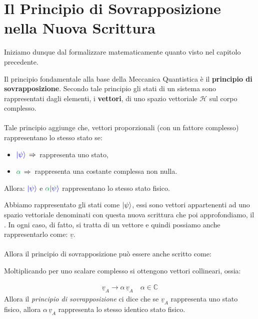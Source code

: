 \section{Il Principio di Sovrapposizione nella Nuova Scrittura}

	Iniziamo dunque dal formalizzare matematicamente quanto visto nel capitolo precedente. 
	
\begin{myth}
	Il principio fondamentale alla base della Meccanica Quantistica è il \textbf{principio di sovrapposizione}. Secondo tale principio gli stati di un sistema sono rappresentati dagli elementi, i \textbf{vettori}, di uno spazio vettoriale $\mathcal{H}$ sul corpo complesso. 
	\\
	\\
	Tale principio aggiunge che, vettori proporzionali (con un fattore complesso) rappresentano lo stesso stato se: 
	
\begin{itemize}
	\item $\textcolor{blue}{\ket{\psi}} \, \Rightarrow \, $ rappresenta uno stato,
	\item $\textcolor{ForestGreen}{\alpha} \, \Rightarrow \, $ rappresenta una costante complessa non nulla.
\end{itemize} 
	
	Allora: $\textcolor{blue}{\ket{\psi}}$ e $\textcolor{ForestGreen}{\alpha}\textcolor{blue}{\ket{\psi}}$ rappresentano lo stesso stato fisico.
\end{myth}

	Abbiamo rappresentato gli stati come $\ket{\psi}$, essi sono vettori appartenenti ad uno spazio vettoriale denominati con questa nuova scrittura che poi approfondiamo, il . In ogni caso, di fatto, si tratta di un vettore e quindi possiamo anche rappresentarlo come: $\underline{v}$. 
	\\
	\\
	Allora il principio di sovrapposizione può essere anche scritto come:

\begin{nb}
	Moltiplicando per uno scalare complesso si ottengono vettori collineari, ossia:
	
\begin{align*}
	\underline{v}_A \to \alpha \, \underline{v}_A \quad \alpha \in \mathbb{C}
\end{align*}
	Allora il \textit{principio di sovrapposizione} ci dice che se $\underline{v}_A$ rappresenta uno stato fisico, allora $\alpha \, \underline{v}_A$ rappresenta lo stesso identico stato fisico.
\end{nb}

